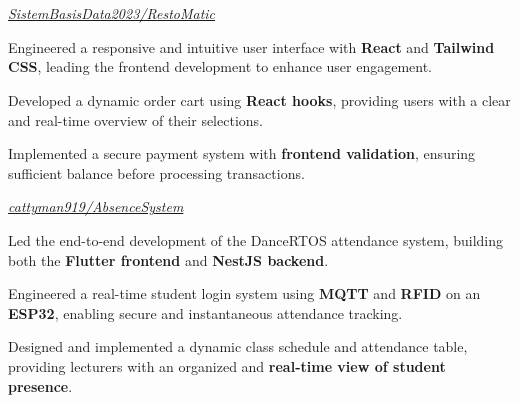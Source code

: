 \documentclass[../main.tex]{subfiles}
\begin{document}
\section{}

\begin{twocolentry}{
    \small
    \textit{\href{https://github.com/SistemBasisData2023/RestoMatic}{SistemBasisData2023/RestoMatic}}
}
\end{twocolentry}

\vspace{0.10 cm}
\begin{onecolentry}
\begin{highlights}
    \item Engineered a responsive and intuitive user interface with \textbf{React} and \textbf{Tailwind CSS}, leading the frontend development to enhance user engagement.
    \item Developed a dynamic order cart using \textbf{React hooks}, providing users with a clear and real-time overview of their selections.
    \item Implemented a secure payment system with \textbf{frontend validation}, ensuring sufficient balance before processing transactions.
\end{highlights}
\end{onecolentry}

\vspace{0.2 cm}

\begin{twocolentry}{
    \small
    \textit{\href{https://github.com/cattyman919/AbsenceSystem}{cattyman919/AbsenceSystem}}
}
\end{twocolentry}

\vspace{0.10 cm}
\begin{onecolentry}
\begin{highlights}
    \item Led the end-to-end development of the DanceRTOS attendance system, building both the \textbf{Flutter frontend} and \textbf{NestJS backend}.
    \item Engineered a real-time student login system using \textbf{MQTT} and \textbf{RFID} on an \textbf{ESP32}, enabling secure and instantaneous attendance tracking.
    \item Designed and implemented a dynamic class schedule and attendance table, providing lecturers with an organized and \textbf{real-time view of student presence}.
\end{highlights}
\end{onecolentry}
\end{document}
